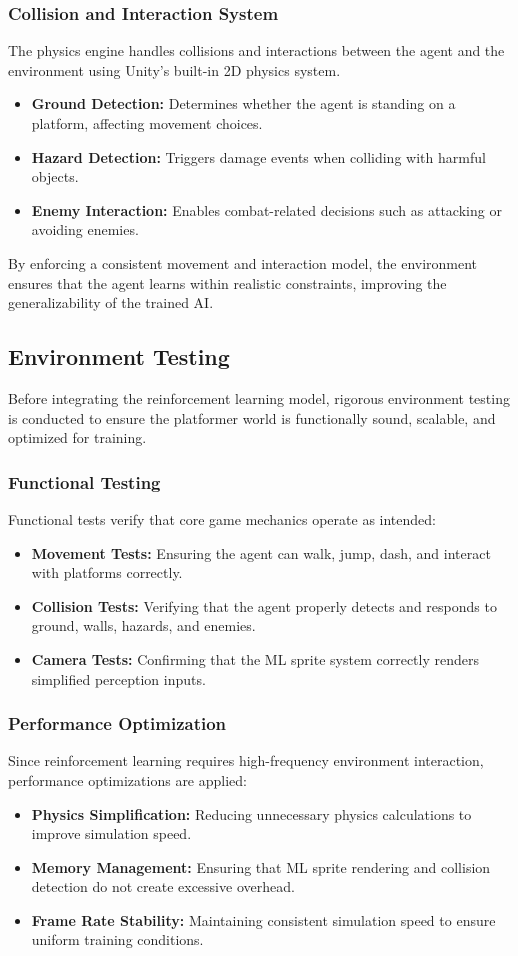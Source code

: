 \documentclass[12pt,oneside,openright,a4paper]{cpe-english-project}
\begin{document}
\subsubsection{Collision and Interaction System}
The physics engine handles collisions and interactions between the agent and the environment using Unity’s built-in 2D physics system.
\begin{itemize}
\item  \textbf{Ground Detection:} Determines whether the agent is standing on a platform, affecting movement choices.
\item  \textbf{Hazard Detection:} Triggers damage events when colliding with harmful objects.
\item  \textbf{Enemy Interaction:} Enables combat-related decisions such as attacking or avoiding enemies.
\end{itemize}
By enforcing a consistent movement and interaction model, the environment ensures that the agent learns within realistic constraints, improving the generalizability of the trained AI.
\subsection{Environment Testing}
Before integrating the reinforcement learning model, rigorous environment testing is conducted to ensure the platformer world is functionally sound, scalable, and optimized for training.
\subsubsection{Functional Testing}
Functional tests verify that core game mechanics operate as intended:
\begin{itemize}
\item  \textbf{Movement Tests:} Ensuring the agent can walk, jump, dash, and interact with platforms correctly.
\item  \textbf{Collision Tests:} Verifying that the agent properly detects and responds to ground, walls, hazards, and enemies.
\item  \textbf{Camera Tests:} Confirming that the ML sprite system correctly renders simplified perception inputs.
\end{itemize}
\subsubsection{Performance Optimization}
Since reinforcement learning requires high-frequency environment interaction, performance optimizations are applied:
\begin{itemize}
\item  \textbf{Physics Simplification:} Reducing unnecessary physics calculations to improve simulation speed.
\item  \textbf{Memory Management:} Ensuring that ML sprite rendering and collision detection do not create excessive overhead.
\item  \textbf{Frame Rate Stability:} Maintaining consistent simulation speed to ensure uniform training conditions.
\end{itemize}
\end{document}
